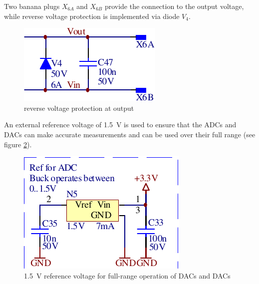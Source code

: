 Two banana  plugs $X_{6A}$ and $X_{6B}$  provide the connection to  the output
voltage, while reverse voltage protection is implemented via diode $V_4$.

\begin{figure}[th!]
    \center
    \includegraphics[width=.35\textwidth]{images/circuit/output-connectors.pdf}
    \caption{reverse voltage protection at output}
    \label{fig:circuit:output}
\end{figure}

An external  reference voltage of \SI{1.5}{\volt}  is used to ensure  that the
ADCs and DACs can  make accurate measurements and can be  used over their full
range (see figure \ref{fig:circuit:vref}).

\begin{figure}[th!]
    \center
    \includegraphics[width=.4\textwidth]{images/circuit/vref.pdf}
    \caption{%
        \SI{1.5}{\volt} reference voltage for full-range operation of DACs and
        DACs
    }
    \label{fig:circuit:vref}
\end{figure}
